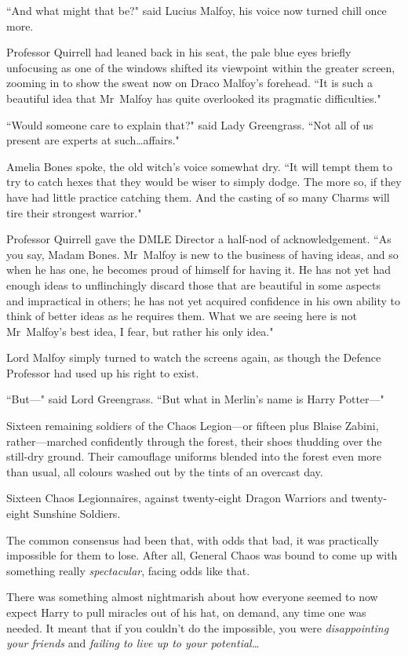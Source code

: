 ``And what might that be?" said Lucius Malfoy, his voice now turned chill once more.

Professor Quirrell had leaned back in his seat, the pale blue eyes briefly unfocusing as one of the windows shifted its viewpoint within the greater screen, zooming in to show the sweat now on Draco Malfoy's forehead. ``It is such a beautiful idea that Mr~Malfoy has quite overlooked its pragmatic difficulties."

``Would someone care to explain that?" said Lady Greengrass. ``Not all of us present are experts at such…affairs."

Amelia Bones spoke, the old witch's voice somewhat dry. ``It will tempt them to try to catch hexes that they would be wiser to simply dodge. The more so, if they have had little practice catching them. And the casting of so many Charms will tire their strongest warrior."

Professor Quirrell gave the DMLE Director a half-nod of acknowledgement. ``As you say, Madam Bones. Mr~Malfoy is new to the business of having ideas, and so when he has one, he becomes proud of himself for having it. He has not yet had enough ideas to unflinchingly discard those that are beautiful in some aspects and impractical in others; he has not yet acquired confidence in his own ability to think of better ideas as he requires them. What we are seeing here is not Mr~Malfoy's best idea, I fear, but rather his only idea."

Lord Malfoy simply turned to watch the screens again, as though the Defence Professor had used up his right to exist.

``But—" said Lord Greengrass. ``But what in Merlin's name is Harry Potter—"

\later

Sixteen remaining soldiers of the Chaos Legion—or fifteen plus Blaise Zabini, rather—marched confidently through the forest, their shoes thudding over the still-dry ground. Their camouflage uniforms blended into the forest even more than usual, all colours washed out by the tints of an overcast day.

Sixteen Chaos Legionnaires, against twenty-eight Dragon Warriors and twenty-eight Sunshine Soldiers.

The common consensus had been that, with odds that bad, it was practically impossible for them to lose. After all, General Chaos was bound to come up with something really \emph{spectacular}, facing odds like that.

There was something almost nightmarish about how everyone seemed to now expect Harry to pull miracles out of his hat, on demand, any time one was needed. It meant that if you couldn't do the impossible, you were \emph{disappointing your friends} and \emph{failing to live up to your potential…}

